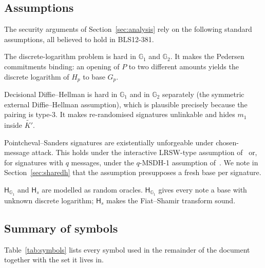 \documentclass[10pt,a5paper]{article}
\newcommand{\K}[1]{#1}                      %
\newcommand{\Go}[1]{#1}                     %
\newcommand{\Gt}[1]{\tilde{#1}}             %
\newcommand{\K}[1]{{\color{ScalarCol}#1}}   %
\newcommand{\Go}[1]{{\color{GoneCol}#1}}    %
\newcommand{\Gt}[1]{{\color{GtwoCol}#1}}    %
\newcommand{\GG}[1]{\mathbb{G}_{#1}}
\newcommand{\Hs}{\mathsf{H}_{s}}
\newcommand{\Hg}{\mathsf{H}_{\GG{1}}}
\begin{document}
\subsection{Assumptions}
\label{sec:assumptions}

The security arguments of Section~\ref{sec:analysis} rely on the following
standard assumptions, all believed to hold in BLS12-381.
\begin{description}[nosep,leftmargin=1.2em]
\item[DL.] The discrete-logarithm problem is hard in $\GG{1}$ and $\GG{2}$. It
  makes the Pedersen commitments binding: an opening of $\Go{P}$ to two
  different amounts yields the discrete logarithm of $\Go{H_p}$ to base $\Go{G_p}$.
\item[DDH / SXDH.] Decisional Diffie--Hellman is hard in $\GG{1}$ and in
  $\GG{2}$ separately (the symmetric external Diffie--Hellman assumption),
  which is plausible precisely because the pairing is type-3. It makes
  re-randomised signatures unlinkable and hides $\K{m_1}$ inside $\Gt{K'}$.
\item[PS unforgeability.] Pointcheval--Sanders signatures are existentially
  unforgeable under chosen-message attack. This holds under the interactive
  LRSW-type assumption of~\cite{ps16} or, for signatures with $q$ messages,
  under the $q$-MSDH-1 assumption of~\cite{ps18}. We note in
  Section~\ref{sec:sharedh} that the assumption presupposes a fresh base per
  signature.
\item[Random oracles.] $\Hg$ and $\Hs$ are modelled as random oracles. $\Hg$
  gives every note a base with unknown discrete logarithm; $\Hs$ makes the
  Fiat--Shamir transform sound.
\end{description}

\subsection{Summary of symbols}

Table~\ref{tab:symbols} lists every symbol used in the remainder of the
document together with the set it lives in.
\end{document}
